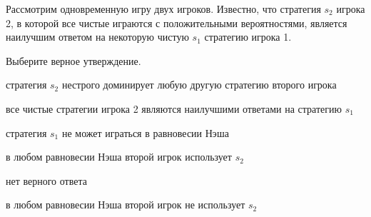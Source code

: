
\begin{question}
Рассмотрим одновременную игру двух игроков.
Известно, что стратегия \(s_2\) игрока 2, в которой все чистые играются с положительными вероятностями,
является наилучшим ответом на некоторую чистую \(s_1\) стратегию игрока 1.

Выберите верное утверждение.
\begin{answerlist}
  \item стратегия \(s_2\) нестрого доминирует любую другую стратегию второго игрока
  \item все чистые стратегии игрока 2 являются наилучшими ответами на стратегию \(s_1\)
  \item стратегия \(s_1\) не может играться в равновесии Нэша
  \item в любом равновесии Нэша второй игрок использует \(s_2\)
  \item нет верного ответа
  \item в любом равновесии Нэша второй игрок не использует \(s_2\)
\end{answerlist}
\end{question}



